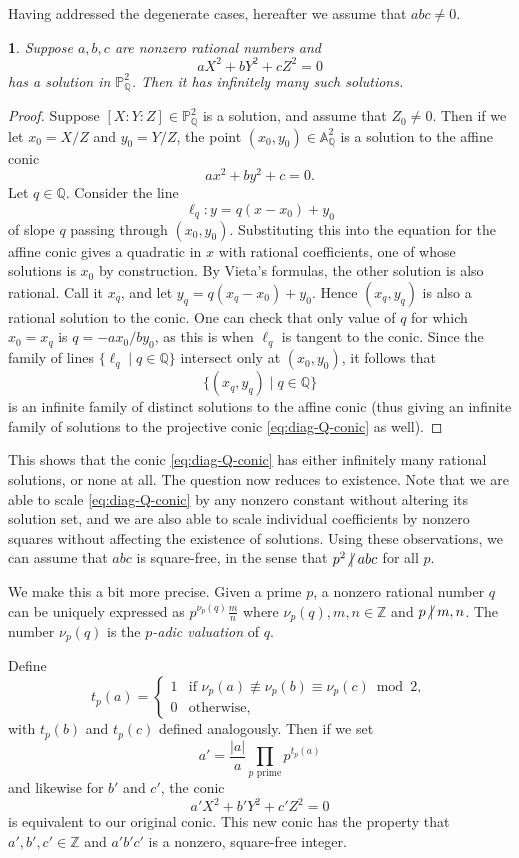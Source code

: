 \documentclass[10pt,a4paper]{amsart}
\numberwithin{equation}{section}
\numberwithin{figure}{section}
\numberwithin{table}{section}
\theoremstyle{definition}
\theoremstyle{plain}
\theoremstyle{remark}
\theoremstyle{plain}
\theoremstyle{definition}
\theoremstyle{plain}
\theoremstyle{plain}
\newtheorem{lem}[thm]{\protect\lemmaname}
\providecommand{\lemmaname}{Lemma}
\newcommand{\A}{\mathbb{A}}
\renewcommand{\P}{\mathbb{P}}
\newcommand{\Z}{\mathbb{Z}}
\newcommand{\Q}{\mathbb{Q}}
\newcommand{\ndiv}{\centernot|}
\begin{document}
	Having addressed the degenerate cases, hereafter we assume that $abc\neq 0$.
	\begin{lem}\label{lem:infinitely-many-Q-soln}
		Suppose $a,b,c$ are nonzero rational numbers and
		\begin{equation}\label{eq:diag-Q-conic}
		aX^2 + bY^2 + cZ^2 = 0
		\end{equation}
		has a solution in $\P^2_\Q$. Then it has infinitely many such solutions.
	\end{lem}
	\begin{proof}
		Suppose $[X:Y:Z]\in \P^2_\Q$ is a solution, and assume that $Z_0 \neq 0$. Then if we let $x_0 = X/Z$ and $y_0 = Y/Z$, the point $(x_0,y_0) \in \A^2_\Q$ is a solution to the affine conic
		\[
		ax^2 + by^2 + c = 0.
		\]
		Let $q\in \Q$. Consider the line
		\[
		\ell_q\colon y = q(x-x_0) + y_0
		\]
		of slope $q$ passing through $(x_0,y_0)$. Substituting this into the equation for the affine conic gives a quadratic in $x$ with rational coefficients, one of whose solutions is $x_0$ by construction. By Vieta's formulas, the other solution is also rational. Call it $x_q$, and let $y_q = q(x_q - x_0) + y_0$. Hence $(x_q,y_q)$ is also a rational solution to the conic. One can check that only value of $q$ for which $x_0 = x_q$ is $q = -ax_0 / by_0$, as this is when $\ell_q$ is tangent to the conic. Since the family of lines $\{\ell_q \mid q\in\Q\}$ intersect only at $(x_0,y_0)$, it follows that
		\[
		\{(x_q,y_q) \mid q\in\Q\}
		\]
		is an infinite family of distinct solutions to the affine conic (thus giving an infinite family of solutions to the projective conic \eqref{eq:diag-Q-conic} as well).
	\end{proof}
	This shows that the conic \eqref{eq:diag-Q-conic} has either infinitely many rational solutions, or none at all. The question now reduces to existence. Note that we are able to scale \eqref{eq:diag-Q-conic} by any nonzero constant without altering its solution set, and we are also able to scale individual coefficients by nonzero squares without affecting the existence of solutions. Using these observations, we can assume that $abc$ is square-free, in the sense that $p^2\ndiv abc$ for all $p$.
	
	We make this a bit more precise. Given a prime $p$, a nonzero rational number $q$ can be uniquely expressed as $p^{\nu_p(q)}\frac{m}{n}$ where $\nu_p(q),m,n\in\Z$ and $p\ndiv m,n$. The number $\nu_p(q)$ is the \emph{$p$-adic valuation} of $q$.
	
	Define
	\[
	t_p(a) = \begin{cases}
	1 & \text{if } \nu_p(a)\not\equiv\nu_p(b)\equiv\nu_p(c)\bmod 2,\\
	0 & \text{otherwise,}
	\end{cases}
	\]
	with $t_p(b)$ and $t_p(c)$ defined analogously. Then if we set
	\begin{equation}\label{eq:t_p-squarefree}
	a' = \frac{|a|}{a}\prod_{p \text{ prime}} p^{t_p(a)}
	\end{equation}
	and likewise for $b'$ and $c'$, the conic
	\[
	a'X^2 + b'Y^2 + c'Z^2 = 0
	\]
	is equivalent to our original conic. This new conic has the property that $a',b',c'\in \Z$ and $a'b'c'$ is a nonzero, square-free integer.
	
\end{document}
